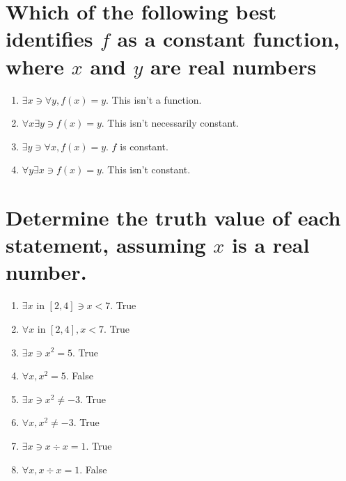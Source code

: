\documentclass[11pt]{article} %
\begin{document}
\section{Which of the following best identifies $f$ as a constant function, where $x$ and $y$ are real numbers}
\begin{enumerate}
\item $\exists x \ni \forall y, f(x)=y$.
\subitem This isn't a function.
\item $\forall x \exists y \ni f(x) = y$.
\subitem This isn't necessarily constant.
\item $\exists y \ni \forall x, f(x) = y$.
\subitem $f$ is constant.
\item $\forall y \exists x \ni f(x) = y$.
\subitem This isn't constant.
\end{enumerate}

\section{Determine the truth value of each statement, assuming $x$ is a real number.}
\begin{enumerate}
\item $\exists x$ in $\left[ 2,4 \right] \ni x<7$.
\subitem True
\item $\forall x$ in $\left[ 2,4 \right], x<7$.
\subitem True
\item $\exists x \ni x^2=5$.
\subitem True
\item $\forall x, x^2=5$.
\subitem False
\item $\exists x \ni x^2 \neq -3$.
\subitem True
\item $\forall x, x^2 \neq -3$.
\subitem True
\item $\exists x \ni x \div x = 1$.
\subitem True
\item $\forall x, x \div x = 1$.
\subitem False
\end{enumerate}
\end{document}
